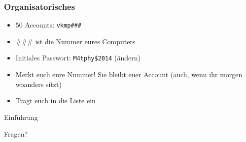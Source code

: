 \documentclass{beamer}
\begin{document}
\begin{frame}
    \frametitle{Organisatorisches}
    \begin{itemize}
        \item 50 Accounts: \texttt{vkmp\#\#\#}
        \pause\item \#\#\# ist die Nummer eures Computers
        \pause\item Initiales Passwort: \texttt{M4tphy\$2014} (ändern)
        \pause\item Merkt euch eure Nummer! Sie bleibt euer Account (auch, wenn
            ihr morgen woanders sitzt)
        \pause\item Tragt euch in die Liste ein
    \end{itemize}
\end{frame}

\begin{frame}
    \begin{center}
        \Huge Einführung
    \end{center}
    \begin{center}
        \pause\Huge Fragen?
    \end{center}
\end{frame}
\end{document}
